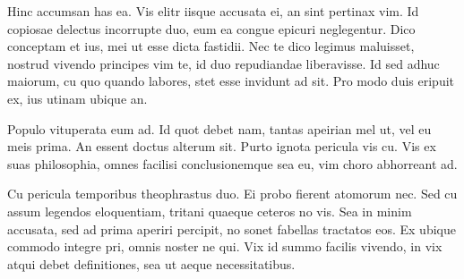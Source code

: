 Hinc accumsan has ea. Vis elitr iisque accusata ei, an sint pertinax vim. Id copiosae delectus incorrupte duo, eum ea congue epicuri neglegentur. Dico conceptam et ius, mei ut esse dicta fastidii. Nec te dico legimus maluisset, nostrud vivendo principes vim te, id duo repudiandae liberavisse. Id sed adhuc maiorum, cu quo quando labores, stet esse invidunt ad sit. Pro modo duis eripuit ex, ius utinam ubique an.

Populo vituperata eum ad. Id quot debet nam, tantas apeirian mel ut, vel eu meis prima. An essent doctus alterum sit. Purto ignota pericula vis cu. Vis ex suas philosophia, omnes facilisi conclusionemque sea eu, vim choro abhorreant ad.

Cu pericula temporibus theophrastus duo. Ei probo fierent atomorum nec. Sed cu assum legendos eloquentiam, tritani quaeque ceteros no vis. Sea in minim accusata, sed ad prima aperiri percipit, no sonet fabellas tractatos eos. Ex ubique commodo integre pri, omnis noster ne qui. Vix id summo facilis vivendo, in vix atqui debet definitiones, sea ut aeque necessitatibus.
